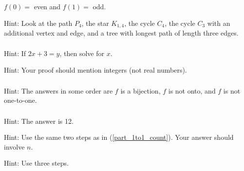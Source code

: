 \subsubsection*{ \answers}
\begin{apart}
    \item $f(0)=$ even and $f(1)=$ odd.
    \item Hint: Look at the path $P_4$, the star $K_{1,4}$, the cycle $C_4$, the cycle $C_3$ with an additional vertex and edge, and a tree with longest path of length three edges.
\end{apart}

\subsubsection*{ \answers}
\begin{apart}
    \item Hint: If $2x+3 = y$, then solve for $x$.
    \item Hint: Your proof should mention integers (not real numbers).
\end{apart}


\subsubsection*{ \answers}
Hint: The answers in some order are $f$ is a bijection, $f$ is not onto, and $f$ is not one-to-one.

\subsubsection*{ \answers}
\begin{apart}
    \item Hint: The answer is 12.
    \item Hint: Use the same two steps as in (\ref{part_1to1_count}). Your answer should involve $n$.
    \item Hint: Use three steps.
\end{apart}

